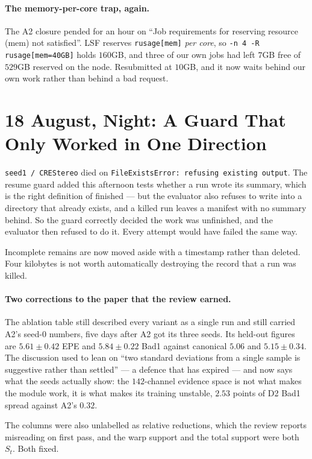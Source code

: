 \documentclass[11pt,a4paper]{article}
\begin{document}
\paragraph{The memory-per-core trap, again.} The A2 closure pended for an hour on
``Job requirements for reserving resource (mem) not satisfied''. LSF reserves
\texttt{rusage[mem]} \emph{per core}, so \texttt{-n 4 -R rusage[mem=40GB]} holds
$160$GB, and three of our own jobs had left $7$GB free of $529$GB reserved on the
node. Resubmitted at $10$GB, and it now waits behind our own work rather than
behind a bad request.


\section*{18 August, Night: A Guard That Only Worked in One Direction}

\texttt{seed1 / CREStereo} died on \texttt{FileExistsError: refusing existing
output}. The resume guard added this afternoon tests whether a run wrote its
summary, which is the right definition of finished --- but the evaluator also
refuses to write into a directory that already exists, and a killed run leaves a
manifest with no summary behind. So the guard correctly decided the work was
unfinished, and the evaluator then refused to do it. Every attempt would have
failed the same way.

Incomplete remains are now moved aside with a timestamp rather than deleted.
Four kilobytes is not worth automatically destroying the record that a run was
killed.

\paragraph{Two corrections to the paper that the review earned.} The ablation
table still described every variant as a single run and still carried A2's
seed-0 numbers, five days after A2 got its three seeds. Its held-out figures are
$5.61\pm0.42$ EPE and $5.84\pm0.22$ Bad1 against canonical $5.06$ and
$5.15\pm0.34$. The discussion used to lean on ``two standard deviations from a
single sample is suggestive rather than settled'' --- a defence that has expired
--- and now says what the seeds actually show: the $142$-channel evidence space
is not what makes the module work, it is what makes its training unstable,
$2.53$ points of D2 Bad1 spread against A2's $0.32$.

The columns were also unlabelled as relative reductions, which the review reports
misreading on first pass, and the warp support and the total support were both
$S_t$. Both fixed.
\end{document}
